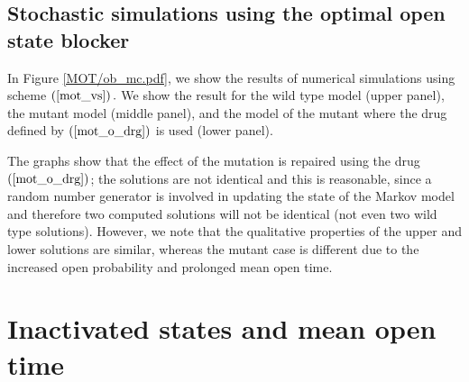\subsection{Stochastic simulations using the optimal open state blocker}

In Figure \ref{MOT/ob_mc.pdf}, we show the results of numerical
simulations using scheme
$\left(  \ref{mot_vs}\right)  .$ We show the result for the wild type model
(upper panel), the mutant model (middle panel), and the model of the mutant 
where the drug defined by $\left(  \ref{mot_o_drg}\right)  $ is used (lower panel).

The graphs show that the effect of the mutation is repaired using the drug $\left(
\ref{mot_o_drg}\right) $; the solutions are not identical and this is
reasonable, since a random number generator is involved in updating the state
of the Markov model and therefore two computed solutions will not be identical
(not even two wild type solutions). However, we note that the qualitative properties
of the upper and lower solutions are similar, whereas the mutant case is
different due to the increased open probability and prolonged mean open time.


\section{Inactivated states and mean open time}

